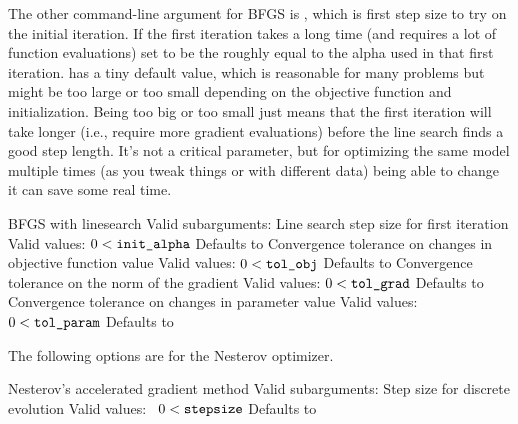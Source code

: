 The other command-line argument for BFGS is , which
is first step size to try on the initial iteration. If the first
iteration takes a long time (and requires a lot of function
evaluations) set  to be the roughly equal to the
alpha used in that first iteration.   has a tiny
default value, which is reasonable for many problems but might be too
large or too small depending on the objective function and
initialization. Being too big or too small just means that the first
iteration will take longer (i.e., require more gradient evaluations)
before the line search finds a good step length. It's not a critical
parameter, but for optimizing the same model multiple times (as
you tweak things or with different data) being able to change it can
save some real time.
%
\begin{description}
        {BFGS with linesearch}
        {Valid subarguments: }
%
           {Line search step size for first iteration}
           {Valid values: $0 < \mbox{{\tt init\_alpha}}$}
           {Defaults to }
%
           {Convergence tolerance on changes in objective function value}
           {Valid values: $0 < \mbox{{\tt tol\_obj}}$}
           {Defaults to }
%
        {Convergence tolerance on the norm of the gradient}
        {Valid values: $0 < \mbox{{\tt tol\_grad}}$}
        {Defaults to }
%
        {Convergence tolerance on changes in parameter value}
        {Valid values: $0 < \mbox{{\tt tol\_param}}$}
        {Defaults to }
%
\end{description}
%
The following options are for the Nesterov optimizer.
%
\begin{description}
        {Nesterov's accelerated gradient method}
        {Valid subarguments: }
%
          {Step size for discrete evolution}
          {Valid values: \  $0 < \mbox{{\tt stepsize}}$}
          {Defaults to }
\end{description}
